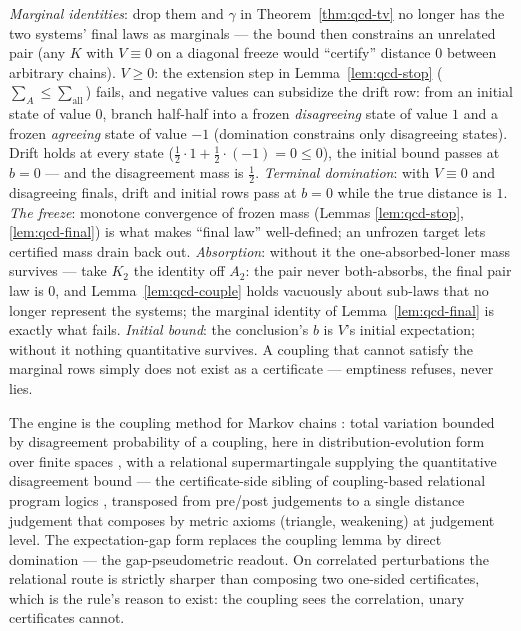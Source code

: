 \begin{bremark}\label{rem:qcd-omit}
\emph{Marginal identities}: drop them and $\gamma$ in
Theorem~\ref{thm:qcd-tv} no longer has the two systems' final laws as
marginals --- the bound then constrains an unrelated pair (any $K$ with
$V \equiv 0$ on a diagonal freeze would ``certify'' distance $0$
between arbitrary chains). \emph{$V \geq 0$}: the extension step in
Lemma~\ref{lem:qcd-stop} ($\sum_A \leq \sum_{\text{all}}$) fails, and
negative values can subsidize the drift row: from an initial state of
value $0$, branch half-half into a frozen \emph{disagreeing} state of
value $1$ and a frozen \emph{agreeing} state of value $-1$ (domination
constrains only disagreeing states). Drift holds at every state
($\tfrac12 \cdot 1 + \tfrac12 \cdot (-1) = 0 \leq 0$), the initial
bound passes at $b = 0$ --- and the disagreement mass is $\tfrac12$. \emph{Terminal domination}: with
$V \equiv 0$ and disagreeing finals, drift and initial rows pass at
$b = 0$ while the true distance is $1$. \emph{The freeze}: monotone
convergence of frozen mass (Lemmas \ref{lem:qcd-stop},
\ref{lem:qcd-final}) is what makes ``final law'' well-defined; an
unfrozen target lets certified mass drain back out.
\emph{Absorption}: without it the one-absorbed-loner mass survives ---
take $K_2$ the identity off $A_2$: the pair never both-absorbs, the
final pair law is $0$, and Lemma~\ref{lem:qcd-couple} holds vacuously
about sub-laws that no longer represent the systems; the marginal
identity of Lemma~\ref{lem:qcd-final} is exactly what fails.
\emph{Initial bound}: the conclusion's $b$ is
$V$'s initial expectation; without it nothing quantitative survives.
A coupling that cannot satisfy the marginal rows simply does not
exist as a certificate --- emptiness refuses, never lies.
\end{bremark}

\begin{bremark}
The engine is the coupling method for Markov chains
\cite{doeblin1938,lindvall1992}: total variation bounded by
disagreement probability of a coupling, here in distribution-evolution
form over finite spaces \cite[Ch.~4--5]{levinperes2017}, with a
relational supermartingale supplying the quantitative disagreement
bound --- the certificate-side sibling of coupling-based relational
program logics \cite{hsu2017}, transposed from pre/post judgements to a
single distance judgement that composes by metric axioms (triangle,
weakening) at judgement level. The expectation-gap form replaces the
coupling lemma by direct domination --- the gap-pseudometric readout.
On correlated perturbations the relational route is strictly sharper
than composing two one-sided certificates, which is the rule's reason
to exist: the coupling sees the correlation, unary certificates
cannot.
\end{bremark}

